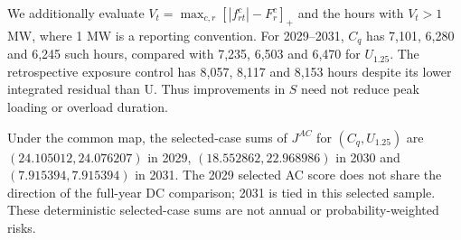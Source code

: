 We additionally evaluate $V_t=\max_{c,r}[|f_{rt}^c|-F_r^c]_+$ and the hours with $V_t>1$ MW, where 1 MW is a reporting convention. For 2029--2031, $C_q$ has 7,101, 6,280 and 6,245 such hours, compared with 7,235, 6,503 and 6,470 for $U_{1.25}$. The retrospective exposure control has 8,057, 8,117 and 8,153 hours despite its lower integrated residual than U. Thus improvements in $S$ need not reduce peak loading or overload duration.

Under the common map, the selected-case sums of $J^{AC}$ for $(C_q,U_{1.25})$ are $(24.105012,24.076207)$ in 2029, $(18.552862,22.968986)$ in 2030 and $(7.915394,7.915394)$ in 2031. The 2029 selected AC score does not share the direction of the full-year DC comparison; 2031 is tied in this selected sample. These deterministic selected-case sums are not annual or probability-weighted risks.
